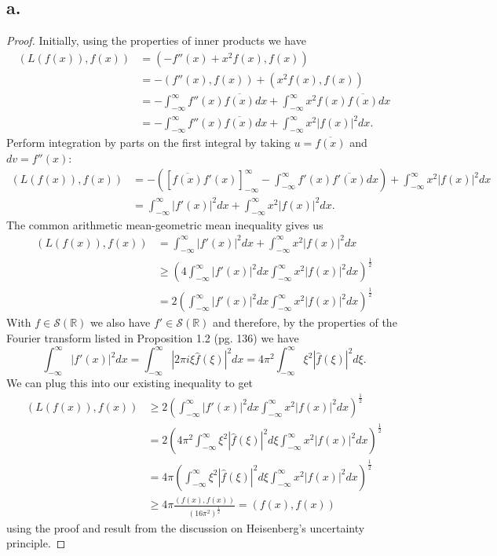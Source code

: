 \documentclass{article}
\begin{document}
\subsection*{a.}
\begin{proof}
    Initially, using the properties of inner products we have 
    \begin{align*}
        (L(f(x)), f(x)) &= (-f''(x) + x^2f(x), f(x)) \\
        &= -(f''(x), f(x)) + (x^2f(x), f(x)) \\
        &= -\int_{-\infty}^{\infty}f''(x)\overline{f(x)}dx + \int_{-\infty}^{\infty}x^2f(x)\overline{f(x)}dx \\
        &= -\int_{-\infty}^{\infty}f''(x)\overline{f(x)}dx + \int_{-\infty}^{\infty}x^2|f(x)|^2dx.
    \end{align*}
    Perform integration by parts on the first integral by taking $u = \overline{f(x)}$ and $dv = f''(x)$:
    \begin{align*}
        (L(f(x)), f(x)) &= -\left([\overline{f(x)}f'(x)]_{-\infty}^{\infty} - \int_{-\infty}^{\infty}f'(x)\overline{f'(x)}dx \right) + \int_{-\infty}^{\infty}x^2|f(x)|^2dx \\
        &= \int_{-\infty}^{\infty}|f'(x)|^2dx + \int_{-\infty}^{\infty}x^2|f(x)|^2dx.
    \end{align*}
    The common arithmetic mean-geometric mean inequality gives us 
    \begin{align*}
        (L(f(x)), f(x)) &= \int_{-\infty}^{\infty}|f'(x)|^2dx + \int_{-\infty}^{\infty}x^2|f(x)|^2dx \\
        &\geq \left(4 \int_{-\infty}^{\infty}|f'(x)|^2dx \int_{-\infty}^{\infty}x^2|f(x)|^2dx \right)^{\frac{1}{2}} \\
        &= 2\left( \int_{-\infty}^{\infty}|f'(x)|^2dx \int_{-\infty}^{\infty}x^2|f(x)|^2dx \right)^{\frac{1}{2}}
    \end{align*}
    With $f \in \mathcal{S}(\mathbb{R})$ we also have $f' \in \mathcal{S}(\mathbb{R})$ and therefore, by the properties of the Fourier transform listed in Proposition 1.2 (pg. 136) we have
    \[
    \int_{-\infty}^{\infty}|f'(x)|^2dx = \int_{-\infty}^{\infty}|2 \pi i \xi \hat{f}(\xi)|^2dx = 4 \pi^2\int_{-\infty}^{\infty}\xi^2|\hat{f}(\xi)|^2d\xi.    
    \]
    We can plug this into our existing inequality to get
    \begin{align*}
        (L(f(x)), f(x)) &\geq 2\left( \int_{-\infty}^{\infty}|f'(x)|^2dx \int_{-\infty}^{\infty}x^2|f(x)|^2dx \right)^{\frac{1}{2}} \\
        &= 2 \left(4 \pi^2 \int_{-\infty}^{\infty}\xi^2|\hat{f}(\xi)|^2d\xi\int_{-\infty}^{\infty}x^2|f(x)|^2dx \right)^{\frac{1}{2}} \\
        &= 4\pi \left(\int_{-\infty}^{\infty}\xi^2|\hat{f}(\xi)|^2d \xi \int_{-\infty}^{\infty}x^2|f(x)|^2dx \right)^{\frac{1}{2}} \\
        &\geq 4 \pi \frac{(f(x), f(x))}{(16\pi^2)^{\frac{1}{2}}} = (f(x), f(x))
    \end{align*}
    using the proof and result from the discussion on Heisenberg's uncertainty principle. 
\end{proof}
\end{document}
